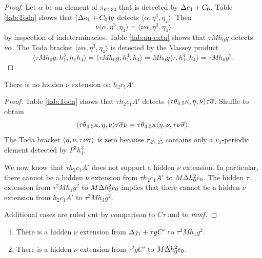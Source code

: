 \begin{proof}
Let $\alpha$ be an element of $\pi_{62,33}$ that is detected
by $\Delta e_1 + C_0$.
Table \ref{tab:Toda} shows that
$(\Delta e_1 + C_0) g$ detects $\langle \alpha, \eta^3, \eta_4 \rangle$.
Then
\[
\nu \langle \alpha, \eta^3, \eta_4 \rangle =
\langle \nu \alpha, \eta^3, \eta_4 \rangle
\]
by inspection of indeterminacies.
Table \ref{tab:nu-extn} shows that $\tau M h_0 g$ detects $\nu \alpha$.
The Toda bracket
$\langle \nu \alpha, \eta^3, \eta_4 \rangle$ is detected by
the Massey product
\[
\langle \tau M h_0 g, h_1^3, h_1 h_4 \rangle =
\langle \tau M h_0 g, h_1^4, h_4 \rangle = 
M h_0 g \langle \tau, h_1^4, h_4 \rangle =
\tau M h_0 g^2.
\]
\end{proof}

\begin{lemma}
\label{lem:nu-h2c1A'}
There is no hidden $\nu$ extension on $h_2 c_1 A'$.
\end{lemma}

\begin{proof}
Table \ref{tab:Toda} shows that 
$\tau h_2 c_1 A'$ detects 
$\langle \tau \theta_{4.5} \kappa, \eta, \nu \rangle \tau \overline{\sigma}$.
Shuffle to obtain
\[
\langle \tau \theta_{4.5} \kappa, \eta, \nu \rangle \tau \overline{\sigma} \nu =
\tau \theta_{4.5} \kappa \langle \eta, \nu, \tau \nu \overline{\sigma} \rangle.
\]
The Toda bracket $\langle \eta, \nu, \tau \nu \overline{\sigma} \rangle$
is zero because $\pi_{27, 15}$ contains only a $v_1$-periodic element
detected by $P^3 h_1^3$.

We now know that $\tau h_2 c_1 A'$ does not support a hidden
$\nu$ extension.  In particular, there cannot be a hidden
$\nu$ extension from $\tau h_2 c_1 A'$ to $M \Delta h_0^2 e_0$.
The hidden $\tau$ extension from $\tau^2 M h_1 g^2$ to 
$M \Delta h_0^2 e_0$ implies that there cannot be a hidden
$\nu$ extension from $h_2 c_1 A'$ to $\tau^2 M h_1 g^2$.

Additional cases are ruled out by comparison to $C\tau$ and
to $\textit{mmf}$.
\end{proof}

\begin{lemma}
\label{lem:nu-Dj1+tgC'}
\mbox{}
\begin{enumerate}
\item
{}
There is a hidden $\nu$ extension from $\Delta j_1 + \tau g C'$ to
$\tau^2 M h_1 g^2$.
\item
{}
There is a hidden $\nu$ extension from $\tau^2 g C'$ to $M \Delta h_0^2 e_0$.
\end{enumerate}
\end{lemma}


